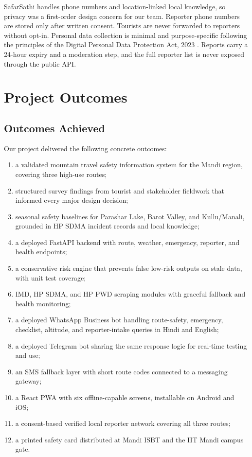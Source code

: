 \documentclass[12pt,a4paper]{article}
\begin{document}
SafarSathi handles phone numbers and location-linked local knowledge, so privacy was a first-order design concern for our team. Reporter phone numbers are stored only after written consent. Tourists are never forwarded to reporters without opt-in. Personal data collection is minimal and purpose-specific following the principles of the Digital Personal Data Protection Act, 2023 \cite{dpdp}. Reports carry a 24-hour expiry and a moderation step, and the full reporter list is never exposed through the public API.

\section{Project Outcomes}

\subsection{Outcomes Achieved}

Our project delivered the following concrete outcomes:

\begin{enumerate}
  \item a validated mountain travel safety information system for the Mandi region, covering three high-use routes;
  \item structured survey findings from tourist and stakeholder fieldwork that informed every major design decision;
  \item seasonal safety baselines for Parashar Lake, Barot Valley, and Kullu/Manali, grounded in HP SDMA incident records and local knowledge;
  \item a deployed FastAPI backend with route, weather, emergency, reporter, and health endpoints;
  \item a conservative risk engine that prevents false low-risk outputs on stale data, with unit test coverage;
  \item IMD, HP SDMA, and HP PWD scraping modules with graceful fallback and health monitoring;
  \item a deployed WhatsApp Business bot handling route-safety, emergency, checklist, altitude, and reporter-intake queries in Hindi and English;
  \item a deployed Telegram bot sharing the same response logic for real-time testing and use;
  \item an SMS fallback layer with short route codes connected to a messaging gateway;
  \item a React PWA with six offline-capable screens, installable on Android and iOS;
  \item a consent-based verified local reporter network covering all three routes;
  \item a printed safety card distributed at Mandi ISBT and the IIT Mandi campus gate.
\end{enumerate}
\end{document}
